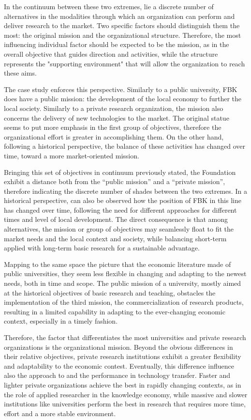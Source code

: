 In the continuum between these two extremes, lie a discrete number of alternatives in the modalities through which an organization can perform and deliver research to the market. Two specific factors should distinguish them the most: the original mission and the organizational structure. Therefore, the most influencing individual factor should be expected to be the mission, as in the overall objective that guides direction and activities, while the structure represents the "supporting environment" that will allow the organization to reach these aims. 

The case study enforces this perspective. Similarly to a public university, FBK does have a public mission: the development of the local economy to further the local society. Similarly to a private research organization, the mission also concerns the delivery of new technologies to the market. The original statue seems to put more emphasis in the first group of objectives, therefore the organizational effort is greater in accomplishing them. On the other hand, following a historical perspective, the balance of these activities has changed over time, toward a more market-oriented mission.

Bringing this set of objectives in continuum previously stated, the Foundation exhibit a distance both from the \enquote{public mission} and a \enquote{private mission}, therefore indicating the discrete number of shades between the two extremes. In a historical perspective, can also be observed how the position of FBK in this line has changed over time, following the need for different approaches for different times and level of local development. The direct consequence is that among alternatives, the mission or group of objectives may seamlessly float to fit the market needs and the local context and society, while balancing short-term applied with long-term basic research for a sustainable advantage.

Mapping to the same space the picture that the economic literature made of public universities, they seem less flexible in changing and adapting to the newest needs, both in time and scope. The public mission of a university, mostly aimed at the historical objectives of basic research and teaching, obstacles the implementation of the third mission, the commercialization of research products, resulting in a limited capability in adapting to the ever-changing economic context, especially in a timely fashion.

Therefore, the factor that differentiates the most universities and private research organizations is the organizational mission. Beyond the obvious differences in their relative objectives, private research institutions exhibit a greater flexibility and adaptability to the economic contest. Eventually, this difference influence also the approach to and the performance in technology transfer. Faster and lighter private organizations achieve the best in rapidly changing contexts, as in the role of applied researcher in the knowledge economy, while massive and slower institutions like universities perform the best in research that requires more time, effort and a more stable environment.

